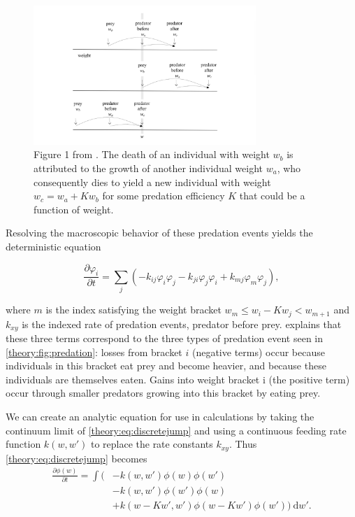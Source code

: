 \documentclass[../main]{subfiles}
\begin{document}
  \begin{figure}[ht]
    \centering
    \caption{Figure 1 from \cite{datta2010}. The death of an individual with weight $w_b$ is attributed to the growth of another individual weight $w_a$, who consequently dies to yield a new individual with weight $w_c = w_a + K w_b$ for some predation efficiency $K$ that could be a function of weight. \label{theory:fig:predation}}
    \includegraphics[width=0.75\textwidth]{_assets/stochastic_predation.png}
  \end{figure}

  Resolving the macroscopic behavior of these predation events yields the deterministic equation

  \begin{equation}\label{theory:eq:discretejump}
    \frac{\partial \varphi_i}{\partial t} = \sum_j \left(- k_{ij} \varphi_i \varphi_j - k_{ji} \varphi_j \varphi_i + k_{mj} \varphi_m \varphi_j \right),
  \end{equation}

  where $m$ is the index satisfying the weight bracket $w_m \leq w_i - K w_j < w_{m+1}$ and $k_{xy}$ is the indexed rate of predation events, predator before prey. \cite{datta2010} explains that these three terms correspond to the three types of predation event seen in \autoref{theory:fig:predation}: losses from bracket $i$ (negative terms) occur because individuals in this bracket eat prey and become heavier, and because these individuals are themselves eaten. Gains into weight bracket i (the positive term) occur through smaller predators growing into this bracket by eating prey.

  We can create an analytic equation for use in calculations by taking the continuum limit of \autoref{theory:eq:discretejump} and using a continuous feeding rate function $k(w, w')$ to replace the rate constants $k_{xy}$. Thus \autoref{theory:eq:discretejump} becomes
  \begin{align}\label{theory:eq:jumpgrowth}
    \frac{\partial \phi(w)}{\partial t}
    = \int ( &- k(w, w') \phi(w)\phi(w') \nonumber \\
    & - k(w, w')\phi(w')\phi(w) \nonumber \\
    & + k(w - Kw', w')\phi(w - Kw')\phi(w')) \: \mathrm{d}w'.
  \end{align}
\end{document}
